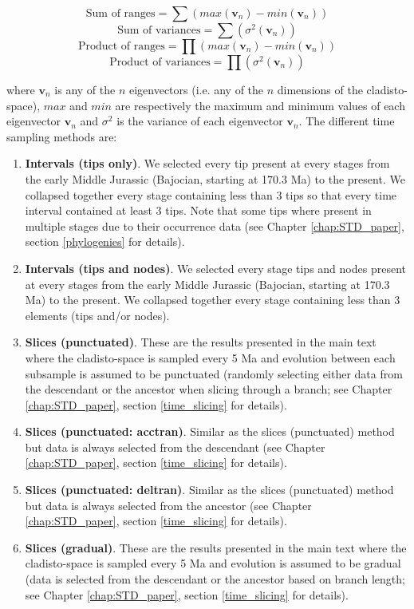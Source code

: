 \begin{equation}
    \text{Sum of ranges}=\sum{(max(\mathbf{v}_{n})-min(\mathbf{v}_{n}))}
\end{equation}
\begin{equation}
    \text{Sum of variances}=\sum{(\sigma^{2}(\mathbf{v}_{n}))}
\end{equation}
\begin{equation}
    \text{Product of ranges}=\prod{(max(\mathbf{v}_{n})-min(\mathbf{v}_{n}))}
\end{equation}
\begin{equation}
    \text{Product of variances}=\prod{(\sigma^{2}(\mathbf{v}_{n}))}
\end{equation}

\noindent
where $\mathbf{v}_{n}$ is any of the $n$ eigenvectors (i.e. any of the $n$ dimensions of the cladisto-space), $max$ and $min$ are respectively the maximum and minimum values of each eigenvector $\mathbf{v}_{n}$ and $\sigma^{2}$ is the variance of each eigenvector $\mathbf{v}_{n}$. The different time sampling methods are:
\begin{enumerate}
\item \textbf{Intervals (tips only)}.
We selected every tip present at every stages from the early Middle Jurassic (Bajocian, starting at 170.3 Ma) to the present.
We collapsed together every stage containing less than 3 tips so that every time interval contained at least 3 tips.
Note that some tips where present in multiple stages due to their occurrence data (see Chapter \ref{chap:STD_paper}, section \ref{phylogenies} for details).
\item \textbf{Intervals (tips and nodes)}.
We selected every stage tips and nodes present at every stages from the early Middle Jurassic (Bajocian, starting at 170.3 Ma) to the present.
We collapsed together every stage containing less than 3 elements (tips and/or nodes).
\item \textbf{Slices (punctuated)}.
These are the results presented in the main text where the cladisto-space is sampled every 5 Ma and evolution between each subsample is assumed to be punctuated (randomly selecting either data from the descendant or the ancestor when slicing through a branch; see Chapter \ref{chap:STD_paper}, section \ref{time_slicing} for details).
\item \textbf{Slices (punctuated: acctran)}.
Similar as the slices (punctuated) method but data is always selected from the descendant (see Chapter \ref{chap:STD_paper}, section \ref{time_slicing} for details).
\item \textbf{Slices (punctuated: deltran)}.
Similar as the slices (punctuated) method but data is always selected from the ancestor (see Chapter \ref{chap:STD_paper}, section \ref{time_slicing} for details).
\item \textbf{Slices (gradual)}.
These are the results presented in the main text where the cladisto-space is sampled every 5 Ma and evolution is assumed to be gradual (data is selected from the descendant or the ancestor based on branch length; see Chapter \ref{chap:STD_paper}, section \ref{time_slicing} for details).
\end{enumerate}
